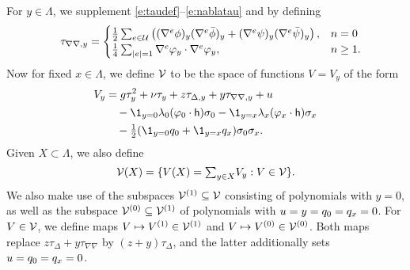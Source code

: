 For $y \in \Lambda$, we supplement \eqref{e:taudef}--\eqref{e:nablatau} and 
by defining
\begin{equation}
\label{e:tauphi2}
\quad \tau_{\nabla\nabla,y}
	=
\begin{cases}
\frac 12 \sum_{e \in \mathcal{U}}
\left(
	(\nabla^e \phi)_y (\nabla^e \bar\phi)_y +
	(\nabla^e \psi)_y (\nabla^e \bar\psi)_y
\right),
	& n = 0 \\
\frac{1}{4} \sum_{|e| = 1} \nabla^e \varphi_y \cdot \nabla^e \varphi_y,
	& n \ge 1.
\end{cases}
\end{equation}
Now for fixed $x \in \Lambda$,
we define $\mathcal{V}$ to be the space of functions $V=V_y$ of the form 
\begin{align}
\lbeq{Vy}
V_y
	&=
g \tau_y^2 + \nu \tau_y + z \tau_{\Delta,y} + y \tau_{\nabla\nabla,y} + u
	\nnb&\quad
- \1_{y=\pp}\lambda_{\pp}(\varphi_{\pp} \cdot {\sf h})\sigma_\pp
- \1_{y=\qq}\lambda_{\qq}(\varphi_{\qq} \cdot {\sf h})\sigma_\qq
	\nnb&\quad
- \textstyle{\frac 12} (\1_{y=\pp} q_\pp + \1_{y=\qq}q_\qq )\sigma_\pp\sigma_\qq.
\end{align}
Given $X \subset \Lambda$, we also define
\begin{equation}
\label{e:Vcalesig}
\mathcal{V}(X) = \{V(X) = \textstyle{\sum_{y\in X}} V_y : V \in \mathcal{V} \}.
\end{equation}
We also make use of the subspaces $\mathcal{V}^{(1)} \subseteq \mathcal{V}$ consisting of polynomials with $y = 0$, as well as the subspace
$\mathcal{V}^{(0)} \subseteq \mathcal{V}^{(1)}$ of polynomials with
$u = y =   q_0=q_x = 0$.
For $V \in \mathcal{V}$, we define maps $V \mapsto V^{(1)} \in \mathcal{V}^{(1)}$
and $V \mapsto V^{(0)} \in \mathcal{V}^{(0)}$. Both maps replace
$z\tau_{\Delta}+y\tau_{\nabla\nabla}$ by
$(z+y)\tau_{\Delta}$, and the latter
additionally sets
$u = q_0 = q_x = 0$.

